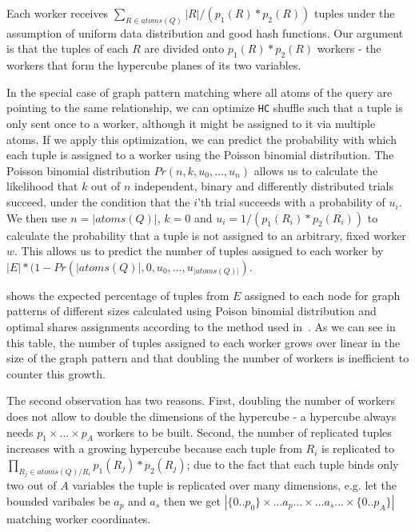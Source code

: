 Each worker receives $\sum_{R \in atoms(Q)} |R| / (p_1(R) * p_2(R))$ tuples under the assumption of uniform data distribution and good hash functions.
Our argument is that the tuples of each $R$ are divided onto $p_1(R) * p_2(R)$ workers - the workers that form the hypercube planes of its two variables.

In the special case of graph pattern matching where all atoms of the query are pointing to the same relationship, we can optimize \texttt{HC} shuffle such that a tuple is only sent once to a worker, although it might be assigned to it via multiple atoms.
If we apply this optimization, we can predict the probability with which each tuple is assigned to a worker using the Poisson binomial distribution.
The Poisson binomial distribution $Pr(n, k, u_0, ..., u_n)$ allows us to calculate the likelihood that $k$ out of $n$ independent, binary and differently distributed trials succeed, under the condition that the $i$'th trial succeeds with a probability of $u_i$.
We then use $n = |atoms(Q)|$, $k = 0$ and $u_i=1/(p_1(R_i) * p_2(R_i))$ to calculate the probability that a tuple is not assigned to an arbitrary, fixed worker $w$.
This allows us to predict the number of tuples assigned to each worker by $|E| * (1 - Pr(|atoms(Q)|, 0, u_0, ..., u_{|atoms(Q)|})$.

 shows the expected percentage of tuples from $E$ assigned to each node for graph patterns of different sizes calculated using Poison binomial distribution and optimal shares assignments according to the method used in~\cite{myria-detailed}.
As we can see in this table, the number of tuples assigned to each worker grows over linear in the size of the graph pattern and that doubling the number of workers is inefficient to counter this growth.

The second observation has two reasons.
First, doubling the number of workers does not allow to double the dimensions of the hypercube - a hypercube always needs $p_1 \times ... \times p_A$ workers to be built.
Second, the number of replicated tuples increases with a growing hypercube because each tuple from $R_i$ is replicated to $\prod_{R_j \in atoms(Q)/R_i} p_1(R_j) * p_2(R_j)$; due to the fact that each tuple binds only two out of $A$ variables the tuple is replicated over many dimensions, e.g. let the bounded varibales be $a_p$ and $a_s$ then we get  $|\{0..p_0\} \times ... a_p ... \times ... a_s... \times \{0..p_A\}|$ matching worker coordinates.



